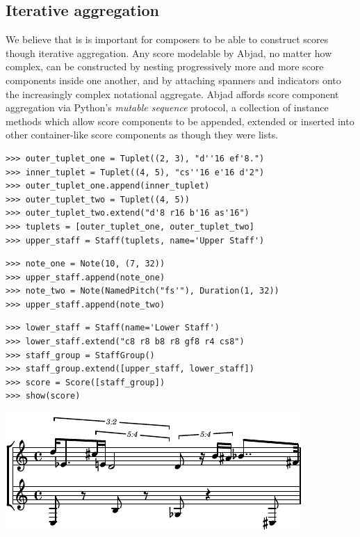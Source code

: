 \documentclass{article}
\begin{document}
\subsection{Iterative aggregation}

We believe that is is important for composers to be able to construct scores
though iterative aggregation. Any score modelable by Abjad, no matter how
complex, can be constructed by nesting progressively more and more score
components inside one another, and by attaching spanners and indicators onto
the increasingly complex notational aggregate. Abjad affords score component
aggregation via Python's \emph{mutable sequence} protocol, a collection of
instance methods which allow score components to be appended, extended or
inserted into other container-like score components as though they were lists.

\begin{lstlisting}
>>> outer_tuplet_one = Tuplet((2, 3), "d''16 ef'8.")
>>> inner_tuplet = Tuplet((4, 5), "cs''16 e'16 d'2")
>>> outer_tuplet_one.append(inner_tuplet)
>>> outer_tuplet_two = Tuplet((4, 5))
>>> outer_tuplet_two.extend("d'8 r16 b'16 as'16")
>>> tuplets = [outer_tuplet_one, outer_tuplet_two]
>>> upper_staff = Staff(tuplets, name='Upper Staff')
\end{lstlisting}


\begin{lstlisting}
>>> note_one = Note(10, (7, 32))
>>> upper_staff.append(note_one)
>>> note_two = Note(NamedPitch("fs'"), Duration(1, 32))
>>> upper_staff.append(note_two)
\end{lstlisting}


\begin{lstlisting}
>>> lower_staff = Staff(name='Lower Staff')
>>> lower_staff.extend("c8 r8 b8 r8 gf8 r4 cs8")
>>> staff_group = StaffGroup()
>>> staff_group.extend([upper_staff, lower_staff])
>>> score = Score([staff_group])
>>> show(score)
\end{lstlisting}

\noindent\includegraphics[scale=1.0]{images/abjad-1.pdf}
\end{document}
